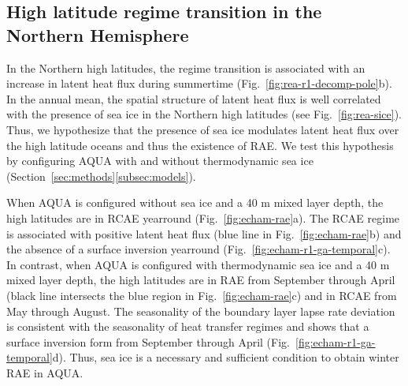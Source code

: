 \documentclass{ametsocV5}
\begin{document}
  \subsection{High latitude regime transition in the Northern Hemisphere} \label{subsec:ice}

  In the Northern high latitudes, the regime transition is associated with an increase in latent heat flux during summertime (Fig.~\ref{fig:rea-r1-decomp-pole}b). In the annual mean, the spatial structure of latent heat flux is well correlated with the presence of sea ice in the Northern high latitudes (see Fig.~\ref{fig:rea-sice}). Thus, we hypothesize that the presence of sea ice modulates latent heat flux over the high latitude oceans and thus the existence of RAE. We test this hypothesis by configuring AQUA with and without thermodynamic sea ice (Section~\ref{sec:methods}\ref{subsec:models}). 

  
  When AQUA is configured without sea ice and a 40 m mixed layer depth, the high latitudes are in RCAE yearround (Fig.~\ref{fig:echam-rae}a). The RCAE regime is associated with positive latent heat flux (blue line in Fig.~\ref{fig:echam-rae}b) and the absence of a surface inversion yearround (Fig.~\ref{fig:echam-r1-ga-temporal}c). In contrast, when AQUA is configured with thermodynamic sea ice and a 40 m mixed layer depth, the high latitudes are in RAE from September through April (black line intersects the blue region in Fig.~\ref{fig:echam-rae}c) and in RCAE from May through August. The seasonality of the boundary layer lapse rate deviation is consistent with the seasonality of heat transfer regimes and shows that a surface inversion form from September through April (Fig.~\ref{fig:echam-r1-ga-temporal}d). Thus, sea ice is a necessary and sufficient condition to obtain winter RAE in AQUA. %

\end{document}
